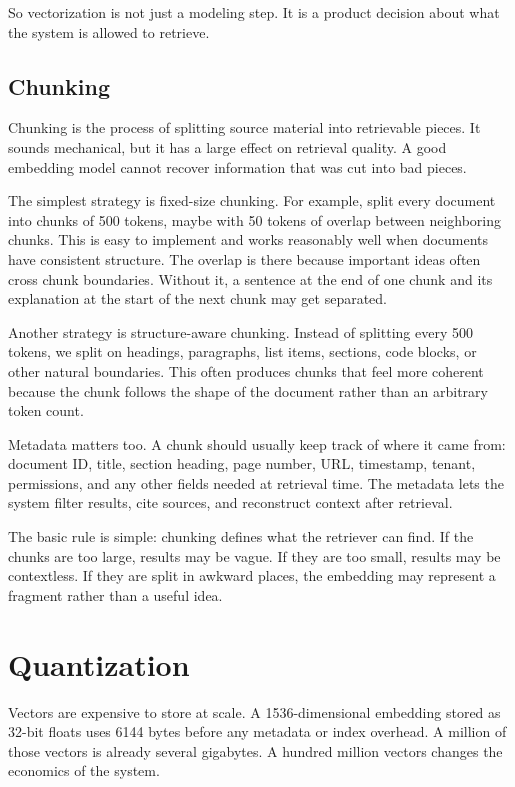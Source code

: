 \documentclass[12pt]{article}
\begin{document}
So vectorization is not just a modeling step. It is a product decision
about what the system is allowed to retrieve.

\subsection{Chunking}

Chunking is the process of splitting source material into retrievable
pieces. It sounds mechanical, but it has a large effect on retrieval
quality. A good embedding model cannot recover information that was cut
into bad pieces.

The simplest strategy is fixed-size chunking. For example, split every
document into chunks of 500 tokens, maybe with 50 tokens of overlap
between neighboring chunks. This is easy to implement and works
reasonably well when documents have consistent structure. The overlap is
there because important ideas often cross chunk boundaries. Without it, a
sentence at the end of one chunk and its explanation at the start of the
next chunk may get separated.

Another strategy is structure-aware chunking. Instead of splitting every
500 tokens, we split on headings, paragraphs, list items, sections, code
blocks, or other natural boundaries. This often produces chunks that feel
more coherent because the chunk follows the shape of the document rather
than an arbitrary token count.

Metadata matters too. A chunk should usually keep track of where it came
from: document ID, title, section heading, page number, URL, timestamp,
tenant, permissions, and any other fields needed at retrieval time. The
metadata lets the system filter results, cite sources, and reconstruct
context after retrieval.

The basic rule is simple: chunking defines what the retriever can find. If
the chunks are too large, results may be vague. If they are too small,
results may be contextless. If they are split in awkward places, the
embedding may represent a fragment rather than a useful idea.

\section{Quantization}

Vectors are expensive to store at scale. A 1536-dimensional embedding
stored as 32-bit floats uses 6144 bytes before any metadata or index
overhead. A million of those vectors is already several gigabytes. A
hundred million vectors changes the economics of the system.
\end{document}
